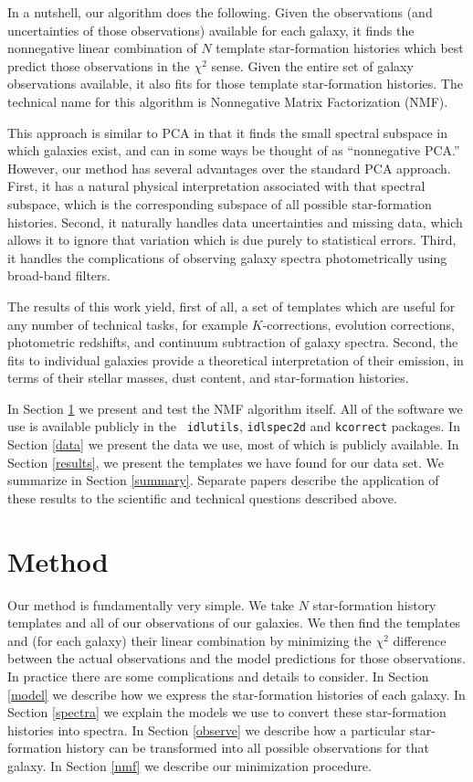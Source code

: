 \documentclass[10pt,preprint]{aastex}
\begin{document}
In a nutshell, our algorithm does the following. Given the
observations (and uncertainties of those observations) available for
each galaxy, it finds the nonnegative linear combination of $N$
template star-formation histories which best predict those
observations in the $\chi^2$ sense. Given the entire set of galaxy
observations available, it also fits for those template star-formation
histories. The technical name for this algorithm is Nonnegative Matrix
Factorization (NMF).

This approach is similar to PCA in that it finds the small spectral
subspace in which galaxies exist, and can in some ways be thought of
as ``nonnegative PCA.''  However, our method has several advantages
over the standard PCA approach. First, it has a natural physical
interpretation associated with that spectral subspace, which is the
corresponding subspace of all possible star-formation
histories. Second, it naturally handles data uncertainties and missing
data, which allows it to ignore that variation which is due purely to
statistical errors.  Third, it handles the complications of observing
galaxy spectra photometrically using broad-band filters.

The results of this work yield, first of all, a set of templates which
are useful for any number of technical tasks, for example
$K$-corrections, evolution corrections, photometric redshifts, and
continuum subtraction of galaxy spectra. Second, the fits to
individual galaxies provide a theoretical interpretation of their
emission, in terms of their stellar masses, dust content, and
star-formation histories.

In Section \ref{algorithm} we present and test the NMF algorithm
itself. All of the software we use is available publicly in the {\tt
idlutils}, {\tt idlspec2d} and {\tt kcorrect} packages.  In Section
\ref{data} we present the data we use, most of which is publicly
available. In Section \ref{results}, we present the templates we have
found for our data set. We summarize in Section
\ref{summary}. Separate papers describe the application of these
results to the scientific and technical questions described above.

\section{Method}
\label{algorithm}

Our method is fundamentally very simple. We take $N$ star-formation
history templates and all of our observations of our galaxies.  We
then find the templates and (for each galaxy) their linear combination
by minimizing the $\chi^2$ difference between the actual observations
and the model predictions for those observations. In practice there
are some complications and details to consider. In Section \ref{model}
we describe how we express the star-formation histories of each
galaxy.  In Section \ref{spectra} we explain the models we use to
convert these star-formation histories into spectra. In Section
\ref{observe} we describe how a particular star-formation history can
be transformed into all possible observations for that galaxy. In
Section \ref{nmf} we describe our minimization procedure.
\end{document}
